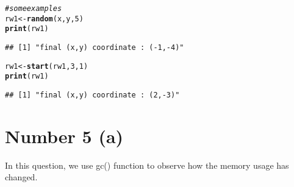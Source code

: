 \documentclass[english]{article}\usepackage[]{graphicx}\usepackage[]{color}
\makeatletter
\newcommand{\hlnum}[1]{\textcolor[rgb]{0.686,0.059,0.569}{#1}}%
\newcommand{\hlcom}[1]{\textcolor[rgb]{0.678,0.584,0.686}{\textit{#1}}}%
\newcommand{\hlstd}[1]{\textcolor[rgb]{0.345,0.345,0.345}{#1}}%
\newcommand{\hlkwb}[1]{\textcolor[rgb]{0.69,0.353,0.396}{#1}}%
\newcommand{\hlkwd}[1]{\textcolor[rgb]{0.737,0.353,0.396}{\textbf{#1}}}%
\newenvironment{kframe}{%
 \def\at@end@of@kframe{}%
 \ifinner\ifhmode%
  \def\at@end@of@kframe{\end{minipage}}%
  \begin{minipage}{\columnwidth}%
 \fi\fi%
 \def\FrameCommand##1{\hskip\@totalleftmargin \hskip-\fboxsep
 \colorbox{shadecolor}{##1}\hskip-\fboxsep
     \hskip-\linewidth \hskip-\@totalleftmargin \hskip\columnwidth}%
 \MakeFramed {\advance\hsize-\width
   \@totalleftmargin\z@ \linewidth\hsize
   \@setminipage}}%
 {\par\unskip\endMakeFramed%
 \at@end@of@kframe}
\newenvironment{knitrout}{}{} %
\makeatother
\begin{document}
\begin{knitrout}
\begin{kframe}
\begin{alltt}
\hlcom{# some examples}
\hlstd{rw1} \hlkwb{<-} \hlkwd{random}\hlstd{(x,y,}\hlnum{5}\hlstd{)}
\hlkwd{print}\hlstd{(rw1)}
\end{alltt}
\begin{verbatim}
## [1] "final (x,y) coordinate : (-1,-4)"
\end{verbatim}
\begin{alltt}
\hlstd{rw1} \hlkwb{<-} \hlkwd{start}\hlstd{(rw1,}\hlnum{3}\hlstd{,}\hlnum{1}\hlstd{)}
\hlkwd{print}\hlstd{(rw1)}
\end{alltt}
\begin{verbatim}
## [1] "final (x,y) coordinate : (2,-3)"
\end{verbatim}
\end{kframe}
\end{knitrout}


\section*{Number 5 (a)}

In this question, we use gc() function to observe how the memory usage
has changed. 
\end{document}
